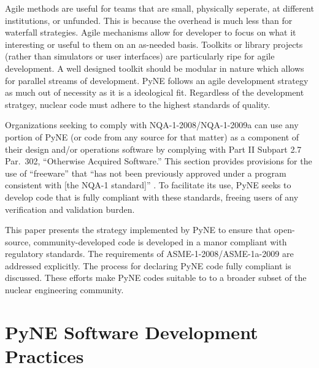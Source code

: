 \documentclass{anstrans}
\begin{document}
Agile methods are useful for teams that are small, physically seperate, at
different institutions, or unfunded. This is because the overhead is much 
less than for waterfall strategies.  Agile mechanisms allow for developer
to focus on what it interesting or useful to them on an as-needed basis.
Toolkits or library projects (rather than simulators or user interfaces) are 
particularly ripe for agile development. A well designed toolkit should be 
modular in nature which allows for parallel streams of development.  
PyNE follows an agile development strategy as much out of necessity as it
is a ideological fit.  Regardless of the development stratgey, nuclear code
must adhere to the highest standards of quality.

Organizations seeking to comply with NQA-1-2008/NQA-1-2009a can use any portion
of PyNE (or code from any source for that matter) as a component of their
design and/or operations software by complying with Part II Subpart 2.7 Par.\
302, ``Otherwise Acquired Software.'' This section provides provisions for the
use of ``freeware'' that ``has not been previously approved under a program
consistent with [the NQA-1 standard]'' \cite{add}.  To facilitate its use, PyNE
seeks to develop code that is fully compliant with these standards, freeing users of
any verification and validation burden.

This paper presents the strategy implemented by PyNE to ensure that
open-source, community-developed code is developed in a manor compliant with
regulatory standards. The requirements of ASME-1-2008/ASME-1a-2009 are
addressed explicitly. The process for declaring PyNE code fully
compliant is discussed. These efforts make PyNE codes suitable to 
to a broader subset of the nuclear engineering community.

\section{PyNE Software Development Practices}
\end{document}

